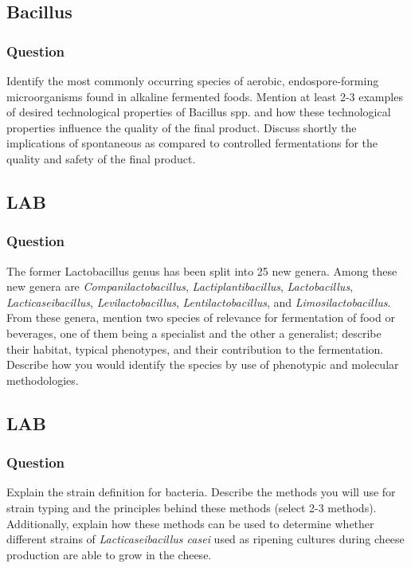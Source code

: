 \subsection{Bacillus}
\subsubsection*{Question}
Identify the most commonly occurring species of aerobic, endospore-forming microorganisms found in alkaline fermented foods. Mention at least 2-3 examples of desired technological properties of Bacillus spp. and how these technological properties influence the quality of the final product. Discuss shortly the implications of spontaneous as compared to controlled fermentations for the quality and safety of the final product.  

\subsection{LAB}
\subsubsection*{Question}
The former Lactobacillus genus has been split into 25 new genera. Among these new genera are \textit{Companilactobacillus}, \textit{Lactiplantibacillus}, \textit{Lactobacillus}, \textit{Lacticaseibacillus}, \textit{Levilactobacillus}, \textit{Lentilactobacillus}, and \textit{Limosilactobacillus}. From these genera, mention two species of relevance for fermentation of food or beverages, one of them being a specialist and the other a generalist; describe their habitat, typical phenotypes, and their contribution to the fermentation. Describe how you would identify the species by use of phenotypic and molecular methodologies.

\subsection{LAB}
\subsubsection*{Question}
Explain the strain definition for bacteria. Describe the methods you will use for strain typing and the principles behind these methods (select 2-3 methods). Additionally, explain how these methods can be used to determine whether different strains of \textit{Lacticaseibacillus casei} used as ripening cultures during cheese production are able to grow in the cheese.


